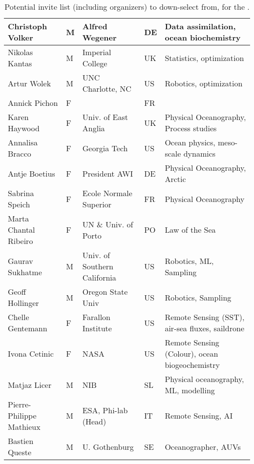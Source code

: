 \begin{table}[]
{\begin{tabular}{|p{3cm}|p{0.5cm}|p{3.5cm}|p{1cm}|p{4cm}|}
\hline
Christoph Volker         & M   & Alfred Wegener                        & DE       & Data assimilation, ocean biochemistry           \\
\hline
Nikolas Kantas           & M   & Imperial College                      & UK       & Statistics, optimization                        \\
\hline
Artur Wolek              & M   & UNC Charlotte, NC                     & US       & Robotics, optimization                          \\
\hline
Annick Pichon            & F   &                                       & FR       &                                                 \\
\hline
Karen Haywood            & F   & Univ. of East Anglia                  & UK       & Physical Oceanography, Process studies          \\
\hline
Annalisa Bracco          & F   & Georgia Tech                          & US       & Ocean physics, meso-scale dynamics              \\
\hline
Antje Boetius            & F   & President AWI                         & DE       & Physical Oceanography, Arctic                   \\
\hline
Sabrina Speich           & F   & Ecole Normale Superior                & FR       & Physical Oceanography                           \\
\hline
Marta Chantal Ribeiro    & F   & UN \& Univ. of Porto                  & PO       & Law of the Sea                                  \\
\hline
Gaurav Sukhatme          & M   & Univ. of Southern California          & US       & Robotics, ML, Sampling                          \\
\hline
Geoff Hollinger          & M   & Oregon State Univ                     & US       & Robotics, Sampling                              \\
\hline
Chelle Gentemann         & F   & Farallon Institute                    & US       & Remote Sensing (SST), air-sea fluxes, saildrone \\
\hline
Ivona Cetinic            & F   & NASA                                  & US       & Remote Sensing (Colour), ocean biogeochemistry  \\
\hline
Matjaz Licer             & M   & NIB                                   & SL & Physical oceanography, ML, modelling            \\
\hline
Pierre-Philippe Mathieux & M   & ESA, Phi-lab (Head)                   & IT       & Remote Sensing, AI                              \\
\hline
Bastien Queste           & M   & U. Gothenburg                         & SE       & Oceanographer, AUVs\\                            
\hline
\end{tabular}
}
  \caption{Potential invite list (including organizers) to down-select from, for the \sympe.}
  \label{tab:part}
\end{table}

